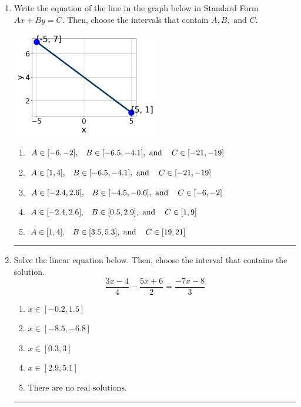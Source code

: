\documentclass[14pt]{extbook}
\newcommand{\litem}[1]{\item#1\hspace*{-1cm}\rule{\textwidth}{0.4pt}}
\begin{document}
\begin{enumerate}
{\begin{enumerate}[label=\Alph*.]
\end{enumerate} }
\litem{
Write the equation of the line in the graph below in Standard Form $Ax+By=C$. Then, choose the intervals that contain $A, B, \text{ and } C$.
\begin{center}
    \includegraphics[width=0.5\textwidth]{../Figures/linearGraphToStandardA.png}
\end{center}
\begin{enumerate}[label=\Alph*.]
\item \( A \in [-6, -2], \hspace{3mm} B \in [-6.5, -4.1], \text{ and } \hspace{3mm} C \in [-21, -19] \)
\item \( A \in [1, 4], \hspace{3mm} B \in [-6.5, -4.1], \text{ and } \hspace{3mm} C \in [-21, -19] \)
\item \( A \in [-2.4, 2.6], \hspace{3mm} B \in [-4.5, -0.6], \text{ and } \hspace{3mm} C \in [-6, -2] \)
\item \( A \in [-2.4, 2.6], \hspace{3mm} B \in [0.5, 2.9], \text{ and } \hspace{3mm} C \in [1, 9] \)
\item \( A \in [1, 4], \hspace{3mm} B \in [3.5, 5.3], \text{ and } \hspace{3mm} C \in [19, 21] \)

\end{enumerate} }
\litem{
Solve the linear equation below. Then, choose the interval that contains the solution.\[ \frac{3x -4}{4} - \frac{5x + 6}{2} = \frac{-7x -8}{3} \]\begin{enumerate}[label=\Alph*.]
\item \( x \in [-0.2, 1.5] \)
\item \( x \in [-8.5, -6.8] \)
\item \( x \in [0.3, 3] \)
\item \( x \in [2.9, 5.1] \)
\item \( \text{There are no real solutions.} \)


\end{enumerate}}
\end{enumerate}
\end{document}
